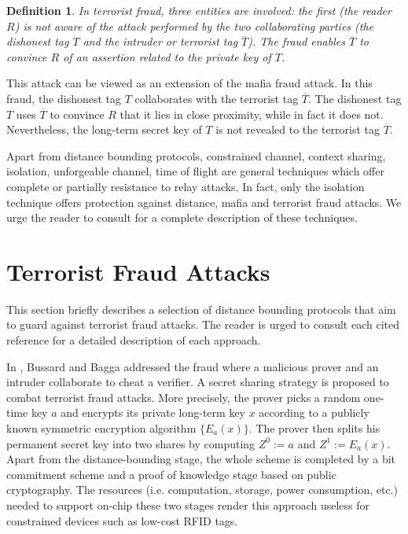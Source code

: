 \documentclass{article}
\newtheorem{definition}{Definition}
\begin{document}
\begin{definition}
In terrorist fraud, three entities are involved: the first (the reader $R$) is not aware of the attack performed by the two collaborating parties (the dishonest tag ${T}$ and the intruder or terrorist tag $\overline{T}$). The fraud enables $\overline{T}$ to convince $R$ of an assertion related to the private key of $T$.
\end{definition}

This attack can be viewed as an extension of the mafia fraud attack. In this fraud, the dishonest tag $T$ collaborates with the terrorist tag $\overline{T}$. The dishonest tag $T$ uses $\overline{T}$ to convince $R$ that it lies in close proximity, while in fact it does not. Nevertheless, the long-term secret key of $T$ is not revealed to the terrorist tag $\overline{T}$.

Apart from distance bounding protocols, constrained channel, context sharing, isolation, unforgeable channel, time of flight are general techniques which offer complete or partially resistance to relay attacks. In fact, only the isolation technique offers protection against distance, mafia and terrorist fraud attacks.  We urge the reader to consult \cite{BussardB05} for a complete description of these techniques.


\section{Terrorist Fraud Attacks}

This section briefly describes a selection of distance bounding protocols that aim to guard against terrorist fraud attacks. The reader is urged to consult each cited reference for a detailed description of each approach.

In \cite{BussardB05}, Bussard and Bagga addressed the fraud where a malicious prover and an intruder collaborate to cheat a verifier.  A secret sharing strategy is proposed to combat terrorist fraud attacks. More precisely, the prover picks a random one-time key $a$ and encrypts its private long-term key $x$ according to a publicly known symmetric encryption algorithm $\{E_a(x)\}$. The prover then splits his permanent secret key into two shares by computing $Z^{0} := a$ and $Z^1 := E_a(x)$.  Apart from the distance-bounding stage, the whole scheme is completed by a bit commitment scheme and a proof of knowledge stage based on public cryptography. The resources (i.e. computation, storage, power consumption, etc.) needed to support on-chip these two stages render this approach useless for constrained devices such as low-cost RFID tags.
\end{document}
